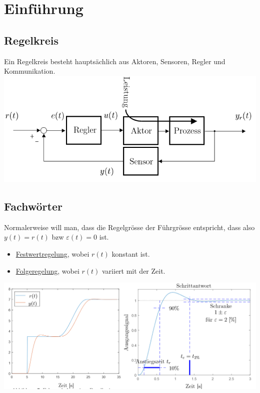 \section{Einführung}
\subsection{Regelkreis} 
Ein Regelkreis besteht hauptsächlich aus Aktoren, Sensoren, Regler und Kommunikation.\\
\includegraphics[width=\columnwidth]{Images/regelkreis_bsp}

\subsection{Fachwörter}
Normalerweise will man, dass die Regelgrösse der Führgrösse entspricht, dass also $y(t) = r(t)$ bzw $\varepsilon(t) = 0$ ist.
\begin{itemize}[nosep]
	\item\underline{Festwertregelung}, wobei $r(t)$ konstant ist.
	\item\underline{Folgeregelung}, wobei $r(t)$ variiert mit der Zeit.
\end{itemize}
\includegraphics[width=\linewidth]{Images/regelkreis}

